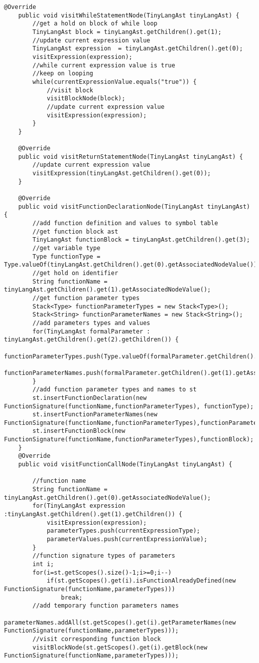 \begin{lstlisting}[basicstyle=\miniscule,caption=Interpreter,label=listing:interpreter]
	@Override
	public void visitWhileStatementNode(TinyLangAst tinyLangAst) {
		//get a hold on block of while loop
		TinyLangAst block = tinyLangAst.getChildren().get(1);
		//update current expression value 
		TinyLangAst expression  = tinyLangAst.getChildren().get(0);
		visitExpression(expression);
		//while current expression value is true 
		//keep on looping 
		while(currentExpressionValue.equals("true")) {
			//visit block 
			visitBlockNode(block);
			//update current expression value
			visitExpression(expression);
		}
	}

	@Override
	public void visitReturnStatementNode(TinyLangAst tinyLangAst) {
		//update current expression value
		visitExpression(tinyLangAst.getChildren().get(0));
	}

	@Override
	public void visitFunctionDeclarationNode(TinyLangAst tinyLangAst) {
		//add function definition and values to symbol table
		//get function block ast
		TinyLangAst functionBlock = tinyLangAst.getChildren().get(3);
		//get variable type
		Type functionType = Type.valueOf(tinyLangAst.getChildren().get(0).getAssociatedNodeValue());
		//get hold on identifier 
		String functionName = tinyLangAst.getChildren().get(1).getAssociatedNodeValue();
		//get function parameter types 
		Stack<Type> functionParameterTypes = new Stack<Type>();
		Stack<String> functionParameterNames = new Stack<String>();
		//add parameters types and values 
		for(TinyLangAst formalParameter : tinyLangAst.getChildren().get(2).getChildren()) {
			functionParameterTypes.push(Type.valueOf(formalParameter.getChildren().get(0).getAssociatedNodeValue()));
			functionParameterNames.push(formalParameter.getChildren().get(1).getAssociatedNodeValue());
		}
		//add function parameter types and names to st
		st.insertFunctionDeclaration(new FunctionSignature(functionName,functionParameterTypes), functionType);
		st.insertFunctionParameterNames(new FunctionSignature(functionName,functionParameterTypes),functionParameterNames);	
		st.insertFunctionBlock(new FunctionSignature(functionName,functionParameterTypes),functionBlock);
	}
	@Override
	public void visitFunctionCallNode(TinyLangAst tinyLangAst) {

		//function name
		String functionName = tinyLangAst.getChildren().get(0).getAssociatedNodeValue();
		for(TinyLangAst expression :tinyLangAst.getChildren().get(1).getChildren()) {
			visitExpression(expression);
			parameterTypes.push(currentExpressionType);
			parameterValues.push(currentExpressionValue);
		}		
		//function signature types of parameters 
		int i;
		for(i=st.getScopes().size()-1;i>=0;i--)
			if(st.getScopes().get(i).isFunctionAlreadyDefined(new FunctionSignature(functionName,parameterTypes)))
				break;
		//add temporary function parameters names
		parameterNames.addAll(st.getScopes().get(i).getParameterNames(new FunctionSignature(functionName,parameterTypes)));
		//visit corresponding function block 
		visitBlockNode(st.getScopes().get(i).getBlock(new FunctionSignature(functionName,parameterTypes)));


\end{lstlisting}
